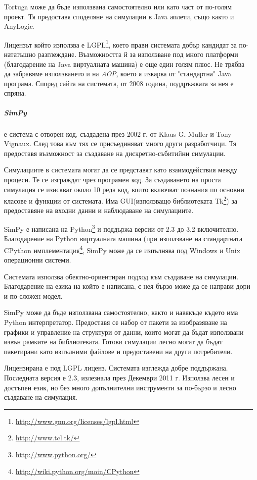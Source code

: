  			Tortuga може да бъде използвана самостоятелно или като част от по-голям проект. 
 			Тя предоставя споделяне на симулации в Java аплети, също както и AnyLogic.
 			
 			Лицензът който използва е \ac{LGPL}\footnote{\url{http://www.gnu.org/licenses/lgpl.html}}, 
 			което прави системата добър кандидат за по-нататъшно разглеждане.
 			Възможността й за използване под много платформи (благодарение на Java виртуалната машина) е 
 			още един голям плюс.
 			Не трябва да забравяме използването и на \emph{AOP}, което я изкарва от "стандартна" Java програма.
 			Според сайта на системата, от 2008 година, поддръжката за нея е спряна. \cite{Tortuga}
					
		\subparagraph{SimPy} е система с отворен код, създадена през 2002 г. от Klaus G. Muller и Tony Vignaux. След това
			към тях се присъединяват много други разработчици. 
			Тя предоставя възможност за създаване на дискретно-събитийни симулации.
			
			Симулациите в системата могат да се представят като взаимодействия между процеси. Те се изграждат чрез
			програмен код. За създаването на проста симулация се изискват около 10 реда код, 
			които включват познания по основни класове и функции от системата. Има GUI(използващо библиотеката 
			Tk\footnote{\url{http://www.tcl.tk/}}) за предоставяне на входни данни и наблюдаване на симулациите.						
		
			SimPy е написана на Python\footnote{\url{http://www.python.org/}} и поддържа версии от 2.3 до 3.2 включително.
			Благодарение на Python виртуалната машина (при използване на стандартната CPython 
			имплементация\footnote{\url{http://wiki.python.org/moin/CPython}}, SimPy може да се изпълнява под 
			Windows и Unix операционни системи.
		
			Системата използва обектно-ориентиран подход към създаване на симулации. Благодарение на езика на който е
			написана, с нея бързо може да се направи дори и по-сложен модел.
								
			SimPy може да бъде използвана самостоятелно, както и навякъде където има Python интерпретатор.
			Предоставя се набор от пакети за изобразяване на графики и управление на структури от данни, които могат
			да бъдат използвани извън рамките на библиотеката. Готови симулации лесно могат да бъдат пакетирани
			като изпълними файлове и предоставени на други потребители.

				Лицензирана е под \ac{LGPL} лиценз. Системата изглежда добре поддържана. Последната версия е 2.3, излезнала през 
			Декември 2011 г. Използва лесен и достъпен език, но без много допълнителни инструменти за по-бързо и лесно
			създаване на симулация. \cite{SimPy}
				
